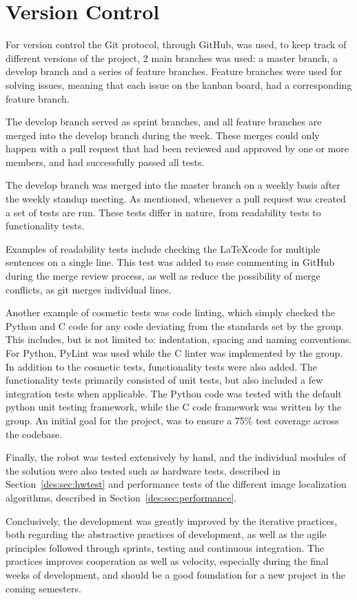 \section{Version Control}
For version control the Git protocol, through GitHub, was used, to keep track of different versions of the project, 2 main branches was used: a master branch, a develop branch and a series of feature branches.
Feature branches were used for solving issues, meaning that each issue on the kanban board, had a corresponding feature branch.

The develop branch served as sprint branches, and all feature branches are merged into the develop branch during the week.
These merges could only happen with a pull request that had been reviewed and approved by one or more members, and had successfully passed all tests.

The develop branch was merged into the master branch on a weekly basis after the weekly standup meeting.
As mentioned, whenever a pull request was created a set of tests are run.
These tests differ in nature, from readability tests to functionality tests.

Examples of readability tests include checking the \LaTeX code for multiple sentences on a single line.
This test was added to ease commenting in GitHub during the merge review process, as well as reduce the possibility of merge conflicts, as git merges individual lines.

Another example of cosmetic tests was code linting, which simply checked the Python and C code for any code deviating from the standards set by the group.
This includes, but is not limited to: indentation, spacing and naming conventions.
For Python, PyLint was used while the C linter was implemented by the group.
In addition to the cosmetic tests, functionality tests were also added.
The functionality tests primarily consisted of unit tests, but also included a few integration tests when applicable.
The Python code was tested with the default python unit testing framework, while the C code framework was written by the group.
An initial goal for the project, was to ensure a 75\% test coverage across the codebase.

Finally, the robot was tested extensively by hand, and the individual modules of the solution were also tested such as hardware tests, described in Section~\ref{des:sec:hwtest} and performance tests of the different image localization algorithms, described in Section~\ref{des:sec:performance}.

Conclusively, the development was greatly improved by the iterative practices, both regarding the abstractive practices of development, as well as the agile principles followed through sprints, testing and continuous integration.
The practices improves cooperation as well as velocity, especially during the final weeks of development, and should be a good foundation for a new project in the coming semesters.

